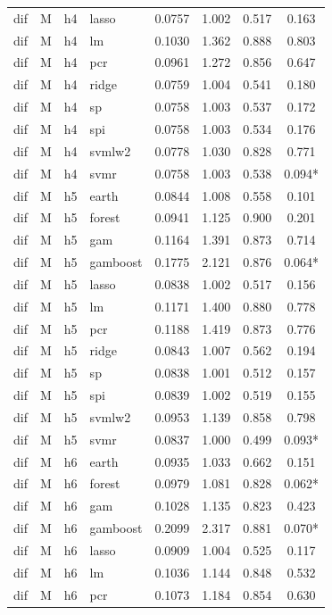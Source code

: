 \begin{ThreePartTable}
\begin{longtable}[t]{llclcccc}
dif & M & h4 & lasso & 0.0757 & 1.002 & 0.517 & 0.163\\
dif & M & h4 & lm & 0.1030 & 1.362 & 0.888 & 0.803\\
dif & M & h4 & pcr & 0.0961 & 1.272 & 0.856 & 0.647\\
dif & M & h4 & ridge & 0.0759 & 1.004 & 0.541 & 0.180\\
dif & M & h4 & sp & 0.0758 & 1.003 & 0.537 & 0.172\\
dif & M & h4 & spi & 0.0758 & 1.003 & 0.534 & 0.176\\
dif & M & h4 & svmlw2 & 0.0778 & 1.030 & 0.828 & 0.771\\
dif & M & h4 & svmr & 0.0758 & 1.003 & 0.538 & 0.094*\\
\addlinespace
dif & M & h5 & earth & 0.0844 & 1.008 & 0.558 & 0.101\\
dif & M & h5 & forest & 0.0941 & 1.125 & 0.900 & 0.201\\
dif & M & h5 & gam & 0.1164 & 1.391 & 0.873 & 0.714\\
dif & M & h5 & gamboost & 0.1775 & 2.121 & 0.876 & 0.064*\\
dif & M & h5 & lasso & 0.0838 & 1.002 & 0.517 & 0.156\\
dif & M & h5 & lm & 0.1171 & 1.400 & 0.880 & 0.778\\
dif & M & h5 & pcr & 0.1188 & 1.419 & 0.873 & 0.776\\
dif & M & h5 & ridge & 0.0843 & 1.007 & 0.562 & 0.194\\
dif & M & h5 & sp & 0.0838 & 1.001 & 0.512 & 0.157\\
dif & M & h5 & spi & 0.0839 & 1.002 & 0.519 & 0.155\\
dif & M & h5 & svmlw2 & 0.0953 & 1.139 & 0.858 & 0.798\\
dif & M & h5 & svmr & 0.0837 & 1.000 & 0.499 & 0.093*\\
\addlinespace
dif & M & h6 & earth & 0.0935 & 1.033 & 0.662 & 0.151\\
dif & M & h6 & forest & 0.0979 & 1.081 & 0.828 & 0.062*\\
dif & M & h6 & gam & 0.1028 & 1.135 & 0.823 & 0.423\\
dif & M & h6 & gamboost & 0.2099 & 2.317 & 0.881 & 0.070*\\
dif & M & h6 & lasso & 0.0909 & 1.004 & 0.525 & 0.117\\
dif & M & h6 & lm & 0.1036 & 1.144 & 0.848 & 0.532\\
dif & M & h6 & pcr & 0.1073 & 1.184 & 0.854 & 0.630\\

\end{longtable}
\end{ThreePartTable}
